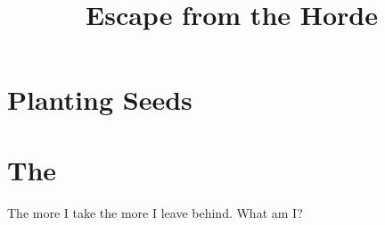 \documentclass[a4paper,openany]{book}
\title{Escape from the Horde}
\begin{document}
\glsunsetall
{}





\mainmatter

\glsresetall


\chapter{Planting Seeds}

\begin{multicols}{2}



\end{multicols}

\stopcontents[sq]

%

\chapter{The }
\epigraph{%
    The more I take the more I leave behind.
    What am I?
}{}



\begin{multicols}{2}



\warrenMap





\end{multicols}

\startappendix





\cleardoublepage
\end{document}
